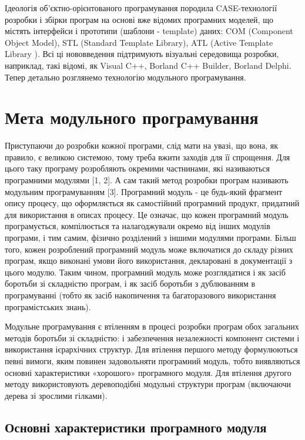 \documentclass[a4paper,14pt, titlepage]{article}
\begin{document}
Ідеологія об'єктно-орієнтованого програмування породила CASE-технології
розробки і збірки програм на основі вже відомих програмних моделей, що
містять інтерфейси і прототипи (шаблони - template) даних: COM
(Component Object Model), STL (Standard Template Library), ATL (Active
Template Library ). Всі ці нововведення підтримують візуальні середовища
розробки, наприклад, такі відомі, як Visual C++, Borland C++ Builder,
Borland Delphi. Тепер детально розглянемо технологію модульного
програмування.


\section{Мета модульного програмування}
Приступаючи до розробки кожної програми, слід мати на увазі, що вона, як
правило, є великою системою, тому треба вжити заходів для її спрощення.
Для цього таку програму розробляють окремими частнинами, які називаються
програмними модулями [1, 2]. А сам такий метод розробки програм
називають модульним програмуванням [3]. Програмний модуль - це
будь-який фрагмент опису процесу, що оформляється як самостійний
програмний продукт, придатний для використання в описах процесу. Це
означає, що кожен програмний модуль програмується, компілюється та
налагоджували окремо від інших модулів програми, і тим самим, фізично
розділений з іншими модулями програми. Більш того, кожен розроблений
програмний модуль може включатися до складу різних програм, якщо
виконані умови його використання, декларовані в документації з цього
модулю. Таким чином, програмний модуль може розглядатися і як засіб
боротьби зі складністю програм, і як засіб боротьби з дублюванням в
програмуванні (тобто як засіб накопичення та багаторазового використання
програмістських знань).

Модульне програмування є втіленням в процесі розробки програм обох
загальних методів боротьби зі складністю: і забезпечення незалежності
компонент системи і використання ієрархічних структур. Для втілення
першого методу формулюються певні вимоги, яким повинен задовольняти
програмний модуль, тобто виявляються основні характеристики «хорошого»
програмного модуля. Для втілення другого методу використовують
деревоподібні модульні структури програм (включаючи дерева зі зрослими
гілками).

\subsection{Основні характеристики програмного модуля}
\end{document}

